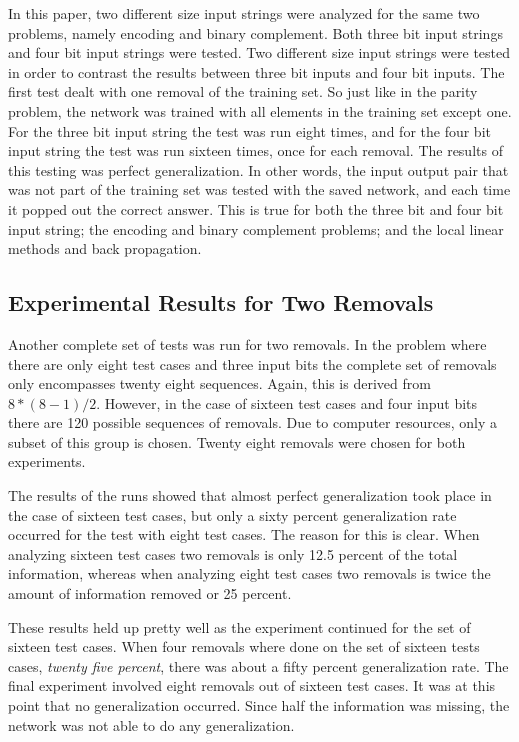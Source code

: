 	In this paper, two different size input strings were analyzed
for the same two problems, namely encoding and binary complement.  Both
three bit input strings and four bit input strings were tested.  Two
different size input strings were tested in order to contrast the
results between three bit inputs and four bit inputs.  The first test
dealt with one removal of the training set.  So just like in the
parity problem, the network was trained with all elements in the
training set except one.  For the three bit input string the test was
run eight times, and for the four bit input string the test was run
sixteen times, once for each removal.  The results of this testing was
perfect generalization.  In other words, the input output pair that
was not part of the training set was tested with the saved network,
and each time it popped out the correct answer.  This is true for both
the three bit and four bit input string; the encoding and
binary complement problems; and the local linear methods and back
propagation.

\subsection{Experimental Results for Two Removals}

	Another complete set of tests was run for two removals.  In
the problem where there are only eight test cases and three input bits
the complete set of removals only encompasses twenty eight sequences.
Again, this is derived from $8 * (8 - 1) / 2$.  However, in the case
of sixteen test cases and four input bits there are 120 possible
sequences of removals.  Due to computer resources, only a subset of
this group is chosen.  Twenty eight removals were chosen for both
experiments.

	The results of the runs showed that almost perfect
generalization took place in the case of sixteen test cases, but only
a sixty percent generalization rate occurred for the test with eight
test cases.  The reason for this is clear.  When analyzing sixteen
test cases two removals is only 12.5 percent of the total information,
whereas when analyzing eight test cases two removals is twice the
amount of information removed or 25 percent.

	These results held up pretty well as the experiment continued
for the set of sixteen test cases.  When four removals where done on
the set of sixteen tests cases, {\it twenty five percent}, there was
about a fifty percent generalization rate.  The final experiment
involved eight removals out of sixteen test cases.  It was at this
point that no generalization occurred.  Since half the information was
missing, the network was not able to do any generalization.

